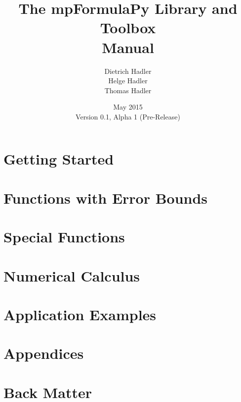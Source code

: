\documentclass[12pt,a4paper,openany]{book}
\numberwithin{equation}{section}
\begin{document}
\begin{titlepage}
\author{
Dietrich Hadler\\
Helge Hadler\\
Thomas Hadler
} 
\title{The mpFormulaPy Library and Toolbox\\[0.2cm]
 Manual} 
\date{May 2015 \\ 
Version {0.1}, Alpha 1 (Pre-Release)}
\maketitle
\end{titlepage}

\thispagestyle{empty}

\setcounter{page}{1}
\frontmatter
\maketitle

\setlength{\parindent}{0pt}



\tableofcontents
\listoftables
\listoffigures

\mainmatter
\setlength{\parindent}{0pt}

\part{Getting Started}



\part{Functions with Error Bounds}



\part{Special Functions}



\part{Numerical Calculus}



\part{Application Examples}



\part{Appendices}
\begin{appendices}

\end{appendices}


\part{Back Matter}
\backmatter
 
 
\printnomenclature[1.2in]
\printindex
\end{document}
